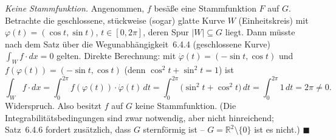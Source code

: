 \documentclass[a4paper,12pt]{article}
\providecommand{\qed}{\hfill\ensuremath{\blacksquare}}
\begin{document}
\emph{Keine Stammfunktion.} Angenommen, $f$ besäße eine Stammfunktion $F$ auf $G$. Betrachte die geschlossene, stückweise (sogar) glatte Kurve $W$ (Einheitskreis) mit $\varphi(t)=(\cos t,\sin t)$, $t\in[0,2\pi]$, deren Spur $|W|\subseteq G$ liegt. Dann müsste nach dem Satz über die Wegunabhängigkeit~6.4.4 (geschlossene Kurve) $\int_W f\cdot dx=0$ gelten. Direkte Berechnung: mit $\dot\varphi(t)=(-\sin t,\cos t)$ und $f(\varphi(t))=(-\sin t,\cos t)$ (denn $\cos^2 t+\sin^2 t=1$) ist
\[ \int_W f\cdot dx=\int_0^{2\pi} f(\varphi(t))\cdot\dot\varphi(t)\,dt
   =\int_0^{2\pi}\big(\sin^2 t+\cos^2 t\big)\,dt=\int_0^{2\pi}1\,dt=2\pi\neq 0. \]
Widerspruch. Also besitzt $f$ auf $G$ keine Stammfunktion. (Die Integrabilitätsbedingungen sind zwar notwendig, aber nicht hinreichend; Satz~6.4.6 fordert zusätzlich, dass $G$ sternförmig ist -- $G=\mathbb{R}^2\setminus\{0\}$ ist es nicht.) \qed
\end{document}

